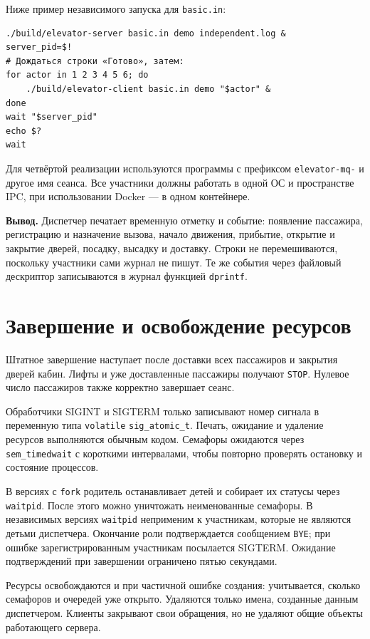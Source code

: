 \documentclass[12pt,a4paper]{article}
\begin{document}
Ниже пример независимого запуска для \verb|basic.in|:
{\small
\begin{verbatim}
./build/elevator-server basic.in demo independent.log &
server_pid=$!
# Дождаться строки «Готово», затем:
for actor in 1 2 3 4 5 6; do
    ./build/elevator-client basic.in demo "$actor" &
done
wait "$server_pid"
echo $?
wait
\end{verbatim}
}
Для четвёртой реализации используются программы с префиксом
\verb|elevator-mq-| и другое имя сеанса. Все участники должны работать
в одной ОС и пространстве IPC, при использовании Docker --- в одном
контейнере.

\textbf{Вывод.} Диспетчер печатает временную отметку и событие:
появление пассажира, регистрацию и назначение вызова, начало движения,
прибытие, открытие и закрытие дверей, посадку, высадку и доставку.
Строки не перемешиваются, поскольку участники сами журнал не пишут.
Те же события через файловый дескриптор записываются в журнал
функцией \verb|dprintf|.

\section{Завершение и освобождение ресурсов}

Штатное завершение наступает после доставки всех пассажиров и закрытия
дверей кабин. Лифты и уже доставленные пассажиры получают \verb|STOP|.
Нулевое число пассажиров также корректно завершает сеанс.

Обработчики SIGINT и SIGTERM только записывают номер сигнала в переменную
типа \verb|volatile| \verb|sig_atomic_t|. Печать, ожидание и удаление ресурсов
выполняются обычным кодом. Семафоры ожидаются через
\verb|sem_timedwait| с короткими интервалами, чтобы повторно проверять
остановку и состояние процессов.

В версиях с \verb|fork| родитель останавливает детей и собирает их
статусы через \verb|waitpid|. После этого можно уничтожать
неименованные семафоры. В независимых версиях \verb|waitpid|
неприменим к участникам, которые не являются детьми диспетчера.
Окончание роли подтверждается сообщением \verb|BYE|; при ошибке
зарегистрированным участникам посылается SIGTERM. Ожидание подтверждений
при завершении ограничено пятью секундами.

Ресурсы освобождаются и при частичной ошибке создания: учитывается,
сколько семафоров и очередей уже открыто. Удаляются только имена,
созданные данным диспетчером. Клиенты закрывают свои обращения, но не
удаляют общие объекты работающего сервера.
\end{document}
